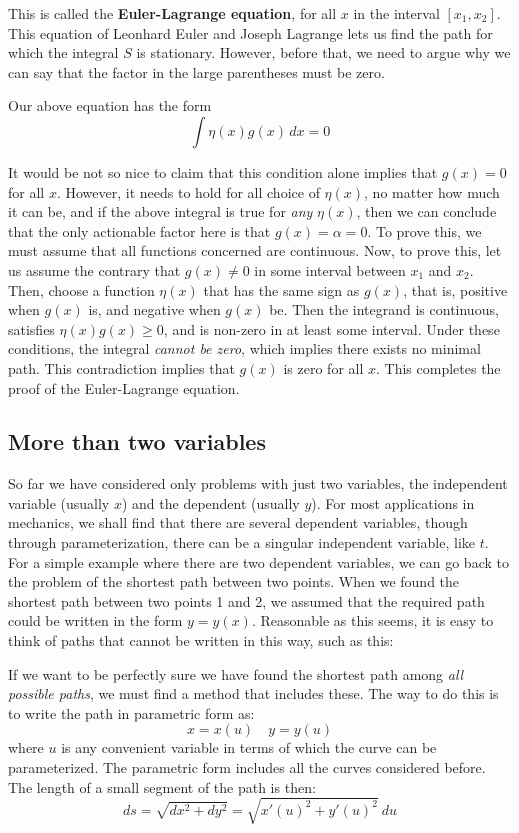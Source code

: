 This is called the \textbf{Euler-Lagrange equation}, for all $x$ in the interval $[x_{1},x_{2}]$. This equation of Leonhard Euler and Joseph Lagrange lets us find the path for which the integral $S$ is stationary. However, before that, we need to argue why we can say that the factor in the large parentheses must be zero. 

Our above equation has the form \begin{equation}
    \int \eta(x)g(x) \, dx = 0
\end{equation}

It would be not so nice to claim that this condition alone implies that $g(x)=0$ for all $x$. However, it needs to hold for all choice of $\eta(x)$, no matter how much it can be, and if the above integral is true for \textit{any} $\eta(x)$, then we can conclude that the only actionable factor here is that $g(x)=\alpha=0$. To prove this, we must assume that all functions concerned are continuous. Now, to prove this, let us assume the contrary that $g(x)\neq 0$ in some interval between $x_{1}$ and $x_{2}$. Then, choose a function $\eta(x)$ that has the same sign as $g(x)$, that is, positive when $g(x)$ is, and negative when $g(x)$ be. Then the integrand is continuous, satisfies $\eta(x)g(x)\geq 0$, and is non-zero in at least some interval. Under these conditions, the integral \textit{cannot be zero}, which implies there exists no minimal path. This contradiction implies that $g(x)$ is zero for all $x$. This completes the proof of the Euler-Lagrange equation. 

\subsection{More than two variables}

So far we have considered only problems with just two variables, the independent variable (usually $x$) and the dependent (usually $y$). For most applications in mechanics, we shall find that there are several dependent variables, though through parameterization, there can be a singular independent variable, like $t$. For a simple example where there are two dependent variables, we can go back to the problem of the shortest path between two points. When we found the shortest path between two points 1 and 2, we assumed that the required path could be written in the form $y=y(x)$. Reasonable as this seems, it is easy to think of paths that cannot be written in this way, such as this:

If we want to be perfectly sure we have found the shortest path among \textit{all possible paths}, we must find a method that includes these. The way to do this is to write the path in parametric form as: $$x=x(u)\quad y=y(u)$$
where $u$ is any convenient variable in terms of which the curve can be parameterized. The parametric form includes all the curves considered before. The length of a small segment of the path is then: 
$$ds=\sqrt{ dx^{2}+ dy^{2} }=\sqrt{ x'(u)^{2}+ y'(u)^{2} }\: du$$


